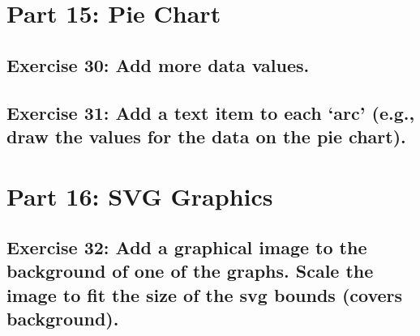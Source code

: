 \documentclass[11pt]{article}   	%
\begin{document}
\section{Part 15: Pie Chart }
\subsection{Exercise 30: Add more data values.}
\subsection{ Exercise 31: Add a text item to each ‘arc’ (e.g., draw the values for the data on the pie chart).}

\section{Part 16: SVG Graphics}
\subsection{ Exercise 32: Add a graphical image to the background of one of the graphs. Scale the image to fit the size of the svg bounds (covers background).}
\end{document}
